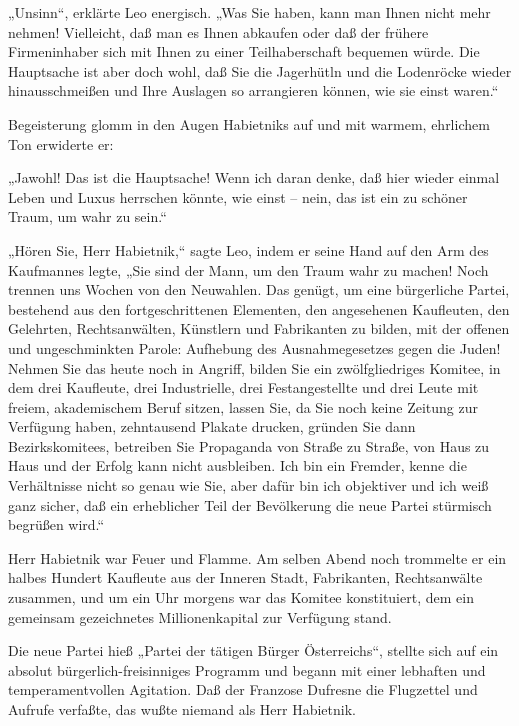 „Unsinn“, erklärte Leo energisch. „Was Sie haben, kann man Ihnen
nicht mehr nehmen! Vielleicht, daß man es Ihnen abkaufen oder daß
der frühere Firmeninhaber sich mit Ihnen zu einer Teilhaberschaft
bequemen würde. Die Hauptsache ist aber doch wohl, daß Sie die
Jagerhütln und die Lodenröcke wieder hinausschmeißen und Ihre
Auslagen so arrangieren können, wie sie einst waren.“

Begeisterung glomm in den Augen Habietniks auf und mit warmem,
ehrlichem Ton erwiderte er:

„Jawohl! Das ist die Hauptsache! Wenn ich daran denke, daß hier
wieder einmal Leben und Luxus herrschen könnte, wie einst – nein,
das ist ein zu schöner Traum, um wahr zu sein.“

„Hören Sie, Herr Habietnik,“ sagte Leo, indem er seine Hand auf den
Arm des Kaufmannes legte, „Sie sind der Mann, um den Traum wahr zu
machen! Noch trennen uns Wochen von den Neuwahlen. Das genügt, um
eine bürgerliche Partei, bestehend aus den fortgeschrittenen
Elementen, den angesehenen Kaufleuten, den Gelehrten,
Rechtsanwälten, Künstlern und Fabrikanten zu bilden, mit der
offenen und ungeschminkten Parole: Aufhebung des Ausnahmegesetzes
gegen die Juden! Nehmen Sie das heute noch in Angriff, bilden Sie
ein zwölfgliedriges Komitee, in dem drei Kaufleute, drei
Industrielle, drei Festangestellte und drei Leute mit freiem,
akademischem Beruf sitzen, lassen Sie, da Sie noch keine Zeitung
zur Verfügung haben, zehntausend  Plakate drucken,
gründen Sie dann Bezirkskomitees, betreiben Sie Propaganda von
Straße zu Straße, von Haus zu Haus und der Erfolg kann nicht
ausbleiben. Ich bin ein Fremder, kenne die Verhältnisse nicht so
genau wie Sie, aber dafür bin ich objektiver und ich weiß ganz
sicher, daß ein erheblicher Teil der Bevölkerung die neue Partei
stürmisch begrüßen wird.“

Herr Habietnik war Feuer und Flamme. Am selben Abend noch trommelte
er ein halbes Hundert Kaufleute aus der Inneren Stadt, Fabrikanten,
Rechtsanwälte zusammen, und um ein Uhr morgens war das Komitee
konstituiert, dem ein gemeinsam gezeichnetes Millionenkapital zur
Verfügung stand.

Die neue Partei hieß „Partei der tätigen Bürger Österreichs“,
stellte sich auf ein absolut bürgerlich-freisinniges Programm und
begann mit einer lebhaften und temperamentvollen Agitation. Daß der
Franzose Dufresne die Flugzettel und Aufrufe verfaßte, das wußte
niemand als Herr Habietnik.

